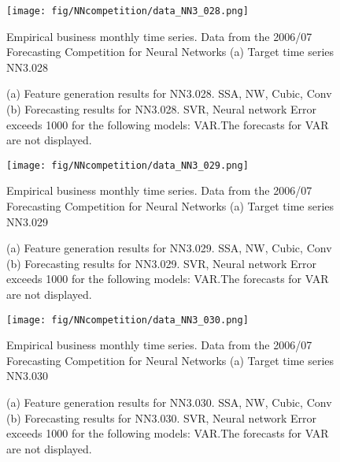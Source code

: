 \documentclass[12pt]{article}
\begin{document}
\begin{figure}
\centering
\texttt{[image: fig/NNcompetition/data\_NN3\_028.png]}
\caption{Empirical business monthly time series. Data from the 2006/07 Forecasting Competition for Neural Networks	(a) Target time series	NN3.028	}
\end{figure}


\begin{figure}
\centering
{}
\caption{(a)	Feature generation results for	NN3.028.	SSA, NW, Cubic, Conv	(b)	Forecasting results for	NN3.028.	SVR, Neural network	Error exceeds 1000 for the following models: VAR.The forecasts for VAR are not displayed.	}
\end{figure}


\begin{figure}
\centering
\texttt{[image: fig/NNcompetition/data\_NN3\_029.png]}
\caption{Empirical business monthly time series. Data from the 2006/07 Forecasting Competition for Neural Networks	(a) Target time series	NN3.029	}
\end{figure}


\begin{figure}
\centering
{}
\caption{(a)	Feature generation results for	NN3.029.	SSA, NW, Cubic, Conv	(b)	Forecasting results for	NN3.029.	SVR, Neural network	Error exceeds 1000 for the following models: VAR.The forecasts for VAR are not displayed.	}
\end{figure}


\begin{figure}
\centering
\texttt{[image: fig/NNcompetition/data\_NN3\_030.png]}
\caption{Empirical business monthly time series. Data from the 2006/07 Forecasting Competition for Neural Networks	(a) Target time series	NN3.030	}
\end{figure}


\begin{figure}
\centering
{}
\caption{(a)	Feature generation results for	NN3.030.	SSA, NW, Cubic, Conv	(b)	Forecasting results for	NN3.030.	SVR, Neural network	Error exceeds 1000 for the following models: VAR.The forecasts for VAR are not displayed.	}
\end{figure}
\end{document}
